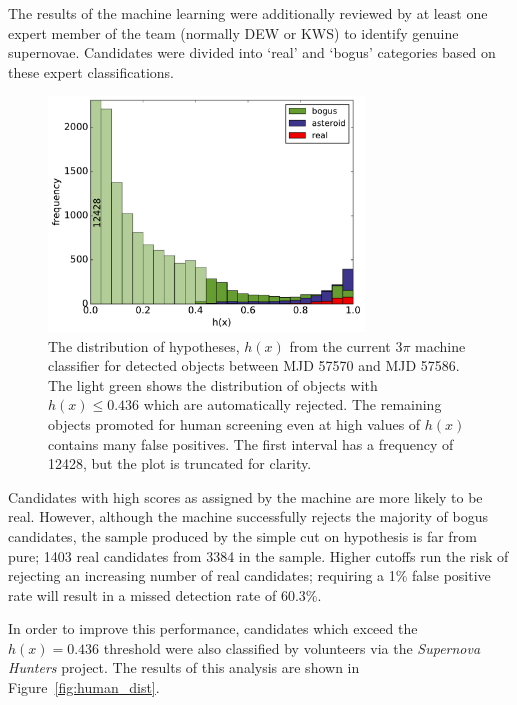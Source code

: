 \documentclass[a4paper,fleqn,usenatbib]{mnras}
\begin{document}
The results of the machine learning were additionally reviewed by at least one expert member of the team (normally DEW or KWS) to identify genuine supernovae. Candidates were divided into `real' and `bogus' categories based on these expert classifications.

\begin{figure}
   \includegraphics[width=84mm]{figs/machine_hist.pdf}
   \caption{The distribution of hypotheses, $h(x)$ from the current 3$\pi$ machine classifier 
            for detected objects between MJD 57570 and MJD 57586.  The light green shows the distribution of 
            objects with $h(x) \leq 0.436$ which are automatically rejected.  The remaining 
            objects promoted for human screening even at high values of $h(x)$ contains
            many false positives.  The first interval has a frequency of 12428, but the plot is truncated for clarity.} 
   \label{fig:machine_dist} 
\end{figure}

Candidates with high scores as assigned by the machine are more likely to be real. However, although the machine successfully rejects the majority of bogus candidates, the sample produced by the simple cut on hypothesis is far from pure; 1403 real candidates from 3384 in the sample. Higher cutoffs run the risk of rejecting an increasing number of real candidates; requiring a 1\% false positive rate will result in a missed detection rate of 60.3\%. 

In order to improve this performance, candidates which exceed the $h(x) = 0.436$ threshold were also classified by volunteers via the \emph{Supernova Hunters} project. The results of this analysis are shown in Figure~\ref{fig:human_dist}. 
\end{document}

